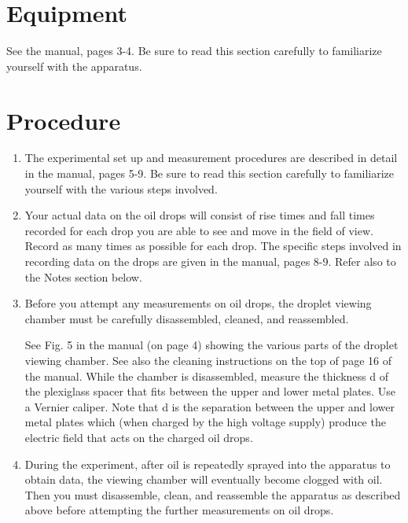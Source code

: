 \section{Equipment}
See the manual, pages 3-4.  Be sure to read this section carefully to
familiarize yourself with the apparatus.


\section{Procedure}

\begin{enumerate}
\item The experimental set up and measurement procedures are described
in detail in the manual, pages 5-9. Be sure to read this section carefully to
familiarize yourself with the various steps involved.


\item Your actual data on the oil drops will consist of rise times and
fall times recorded for each drop you are able to see and move in the
field of view.  Record as many times as possible for each drop. The
specific steps involved in recording data on the drops are given in the manual,
pages 8-9.  Refer also to the Notes section below.

\item Before you attempt any measurements on oil drops, the droplet
viewing chamber must be carefully disassembled, cleaned, and
reassembled.


See Fig. 5 in the manual (on page 4) showing the various parts of the droplet viewing chamber.  See also the cleaning instructions on the top of page 16 of the manual. While
the chamber is disassembled, measure the thickness d of the plexiglass
spacer that fits between the upper and lower metal plates. Use a
Vernier caliper.  Note that d is the separation between the upper and
lower metal plates which (when charged by the high voltage supply)
produce the electric field that acts on the charged oil drops.


\item During the experiment, after oil is repeatedly sprayed into the
apparatus to obtain data, the viewing chamber will eventually become
clogged with oil. Then you must disassemble, clean, and reassemble the
apparatus as described above before attempting the further measurements
on oil drops.
\end{enumerate}

